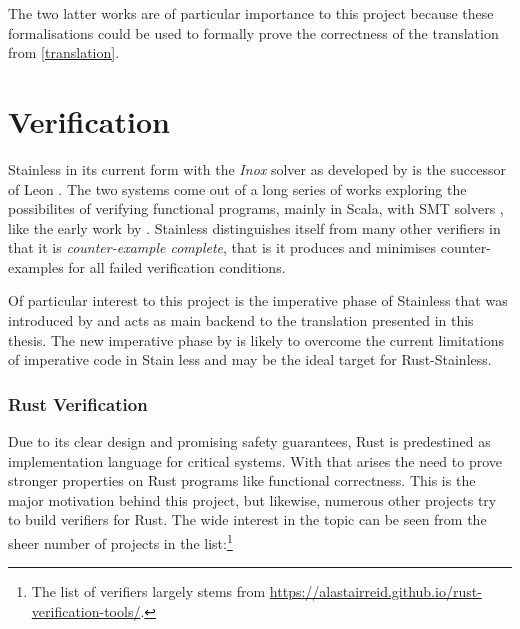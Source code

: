 The two latter works are of particular importance to this project because these
formalisations could be used to formally prove the correctness of the
translation from \autoref{translation}.

\section{Verification}

Stainless in its current form with the \emph{Inox} solver \cite{inox} as
developed by \citet*{stainless} is the successor of Leon \cite{leon}. The two
systems come out of a long series of works exploring the possibilites of
verifying functional programs, mainly in Scala, with SMT solvers \cite{smt},
like the early work by \citet{smrp}. Stainless distinguishes itself from many
other verifiers in that it is \emph{counter-example complete}, that is it
produces and minimises counter-examples for all failed verification conditions.

Of particular interest to this project is the imperative phase of Stainless that
was introduced by \citet{regb} and acts as main backend to the translation
presented in this thesis. The new imperative phase by \citet{new-imperative} is
likely to overcome the current limitations of imperative code in Stain less and
may be the ideal target for Rust-Stainless.

\subsubsection{Rust Verification}

Due to its clear design and promising safety guarantees, Rust is predestined as
implementation language for critical systems. With that arises the need to prove
stronger properties on Rust programs like functional correctness. This is the
major motivation behind this project, but likewise, numerous other projects try
to build verifiers for Rust. The wide interest in the topic can be seen from the
sheer number of projects in the list:\footnote{The list of verifiers
largely stems from
\url{https://alastairreid.github.io/rust-verification-tools/}.}

